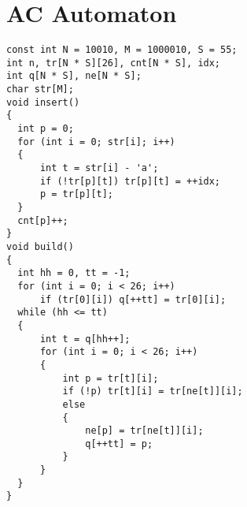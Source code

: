 \section{AC Automaton}
\begin{lstlisting}
const int N = 10010, M = 1000010, S = 55;
int n, tr[N * S][26], cnt[N * S], idx;
int q[N * S], ne[N * S];
char str[M];
void insert()
{
  int p = 0;
  for (int i = 0; str[i]; i++)
  {
      int t = str[i] - 'a';
      if (!tr[p][t]) tr[p][t] = ++idx;
      p = tr[p][t];
  }
  cnt[p]++;
}
void build()
{
  int hh = 0, tt = -1;
  for (int i = 0; i < 26; i++)
      if (tr[0][i]) q[++tt] = tr[0][i];
  while (hh <= tt)
  {
      int t = q[hh++];
      for (int i = 0; i < 26; i++)
      {
          int p = tr[t][i];
          if (!p) tr[t][i] = tr[ne[t]][i];
          else
          {
              ne[p] = tr[ne[t]][i];
              q[++tt] = p;
          }
      }
  }
}
\end{lstlisting}

